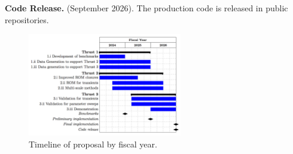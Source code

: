 \noindent \textbf{Code Release.} (September 2026). The production code is
released in public repositories.


\begin{figure}[t!] \centering
    \includegraphics[width = 0.60\textwidth]{figs/neup_gantt.png}
    \caption{Timeline of proposal by fiscal year.  \label{fig:gantt}}
\end{figure}

